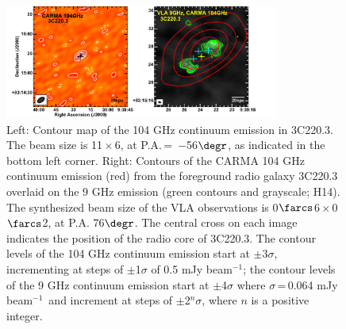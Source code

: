 \documentclass[twocolumn,apj,numberedappendix]{emulateapj}
\newcommand{\CO}{\mbox{CO($J$\,=\,3\,$\rightarrow$\,2) }}
\newcommand{\pmOne}{\mbox{$^{-1}$}}
\begin{document}
\begin{figure}[tbph]
\centering
\includegraphics[width=0.80\textwidth]{Figure/ContPanel.pdf}
\caption{Left: Contour map of the 104 GHz continuum emission in 3C220.3. The beam size is 11\,$\times$\,6, at P.A.\,=\,
$-$56$\degr$, as indicated in the bottom left corner. Right: Contours of the CARMA 104 GHz continuum emission (red) from the 
foreground radio galaxy 3C220.3 overlaid on the 9 GHz emission (green contours and grayscale; H14). The synthesized beam size of the VLA observations is 0$\farcs$6\,$\times$\,0$\farcs$2, at P.A. 
76$\degr$. The central cross on each image indicates the position of the radio core of 3C220.3. The contour levels of the 104 GHz continuum emission start at $\pm$3$\sigma$, incrementing at steps 
of $\pm$1$\sigma$ of 0.5 mJy beam\pmOne; the contour levels of the 9 GHz continuum 
emission start at $\pm$4$\sigma$ where $\sigma$\,=\,0.064 mJy beam\pmOne\ and increment at steps of $\pm$2$^n\sigma$, 
where $n$ is a positive integer.
\label{fig:cont}}
\end{figure}
\end{document}
